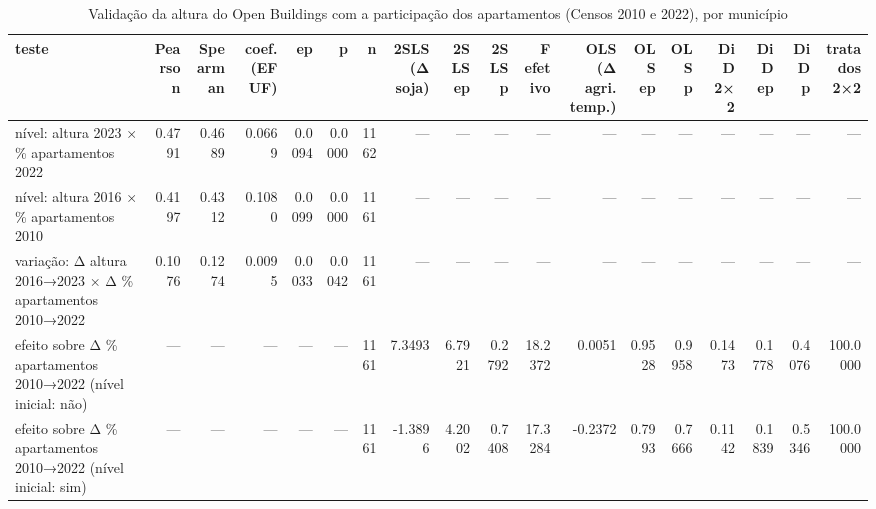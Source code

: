 \begin{table}
\caption{Validação da altura do Open Buildings com a participação dos apartamentos (Censos 2010 e 2022), por município}
\label{tab:s08_verticalizacao}
\begin{tabular}{lrrrrrrrrrrrrrrrrr}
\toprule
teste & Pearson & Spearman & coef. (EF UF) & ep & p & n & 2SLS (Δ soja) & 2SLS ep & 2SLS p & F efetivo & OLS (Δ agri. temp.) & OLS ep & OLS p & DiD 2×2 & DiD ep & DiD p & tratados 2×2 \\
\midrule
nível: altura 2023 × \% apartamentos 2022 & 0.4791 & 0.4689 & 0.0669 & 0.0094 & 0.0000 & 1162 & — & — & — & — & — & — & — & — & — & — & — \\
nível: altura 2016 × \% apartamentos 2010 & 0.4197 & 0.4312 & 0.1080 & 0.0099 & 0.0000 & 1161 & — & — & — & — & — & — & — & — & — & — & — \\
variação: Δ altura 2016→2023 × Δ \% apartamentos 2010→2022 & 0.1076 & 0.1274 & 0.0095 & 0.0033 & 0.0042 & 1161 & — & — & — & — & — & — & — & — & — & — & — \\
efeito sobre Δ \% apartamentos 2010→2022 (nível inicial: não) & — & — & — & — & — & 1161 & 7.3493 & 6.7921 & 0.2792 & 18.2372 & 0.0051 & 0.9528 & 0.9958 & 0.1473 & 0.1778 & 0.4076 & 100.0000 \\
efeito sobre Δ \% apartamentos 2010→2022 (nível inicial: sim) & — & — & — & — & — & 1161 & -1.3896 & 4.2002 & 0.7408 & 17.3284 & -0.2372 & 0.7993 & 0.7666 & 0.1142 & 0.1839 & 0.5346 & 100.0000 \\
\bottomrule
\end{tabular}
\end{table}
